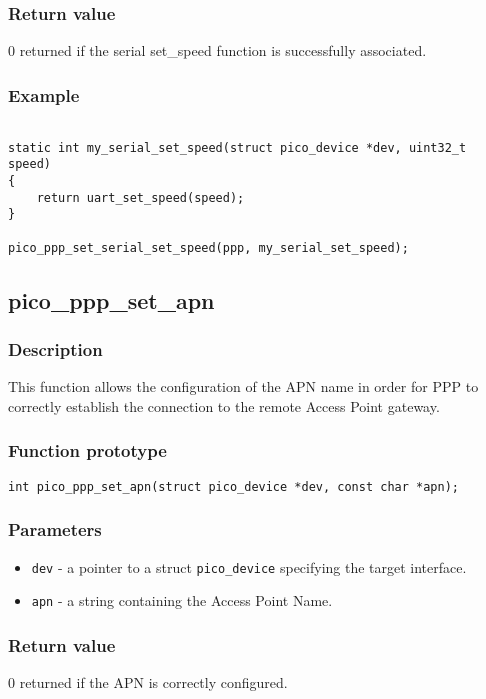 \subsubsection*{Return value}
0 returned if the serial set\_speed function is successfully associated.

\subsubsection*{Example}
\begin{verbatim}

static int my_serial_set_speed(struct pico_device *dev, uint32_t speed)
{
    return uart_set_speed(speed);
}

pico_ppp_set_serial_set_speed(ppp, my_serial_set_speed);
\end{verbatim}


\subsection{pico\_ppp\_set\_apn}
\subsubsection*{Description}
This function allows the configuration of the APN name in order for PPP to correctly establish the connection
to the remote Access Point gateway.

\subsubsection*{Function prototype}
\texttt{int pico\_ppp\_set\_apn(struct pico\_device *dev, const char *apn);}

\subsubsection*{Parameters}
\begin{itemize}[noitemsep]
\item \texttt{dev} - a pointer to a struct \texttt{pico\_device} specifying the target interface.
\item \texttt{apn} - a string containing the Access Point Name. 
\end{itemize}

\subsubsection*{Return value}
0 returned if the APN is correctly configured. 

